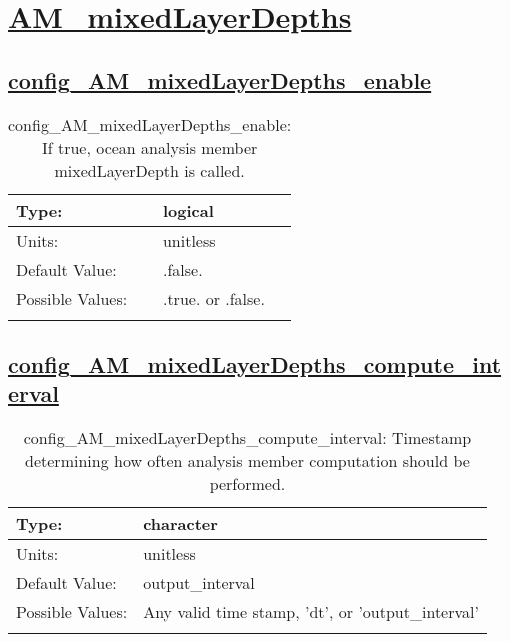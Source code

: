 \section[AM\_mixedLayerDepths]{\hyperref[sec:nm_tab_AM_mixedLayerDepths]{AM\_mixedLayerDepths}}
\label{sec:nm_sec_AM_mixedLayerDepths}
\subsection[config\_AM\_mixedLayerDepths\_enable]{\hyperref[sec:nm_tab_AM_mixedLayerDepths]{config\_AM\_mixedLayerDepths\_enable}}
\label{subsec:nm_sec_config_AM_mixedLayerDepths_enable}
\begin{center}
\begin{longtable}{| p{2.0in} || p{4.0in} |}
    \hline
    Type: & logical \\
    \hline
    Units: & \si{unitless} \\
    \hline
    Default Value: & .false. \\
    \hline
    Possible Values: & .true. or .false. \\
    \hline
    \caption{config\_AM\_mixedLayerDepths\_enable: If true, ocean analysis member mixedLayerDepth is called.}
\end{longtable}
\end{center}
\subsection[config\_AM\_mixedLayerDepths\_compute\_interval]{\hyperref[sec:nm_tab_AM_mixedLayerDepths]{config\_AM\_mixedLayerDepths\_compute\_interval}}
\label{subsec:nm_sec_config_AM_mixedLayerDepths_compute_interval}
\begin{center}
\begin{longtable}{| p{2.0in} || p{4.0in} |}
    \hline
    Type: & character \\
    \hline
    Units: & \si{unitless} \\
    \hline
    Default Value: & output\_interval \\
    \hline
    Possible Values: & Any valid time stamp, 'dt', or 'output\_interval' \\
    \hline
    \caption{config\_AM\_mixedLayerDepths\_compute\_interval: Timestamp determining how often analysis member computation should be performed.}
\end{longtable}
\end{center}
